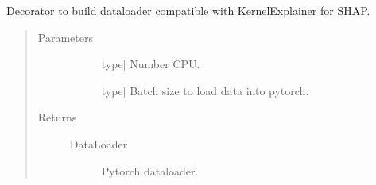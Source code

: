 \documentclass[letterpaper,10pt,english]{sphinxmanual}
\begin{document}
\begin{fulllineitems}
\label{\detokenize{index:methylnet.interpretation_classes.return_dataloader_construct}}
Decorator to build dataloader compatible with KernelExplainer for SHAP.
\begin{quote}\begin{description}
\item[{Parameters}] \leavevmode\begin{description}
\item[{}] \leavevmode{[}type{]}
Number CPU.

\item[{}] \leavevmode{[}type{]}
Batch size to load data into pytorch.

\end{description}

\item[{Returns}] \leavevmode\begin{description}
\item[{DataLoader}] \leavevmode
Pytorch dataloader.

\end{description}

\end{description}\end{quote}

\end{fulllineitems}

\end{document}
